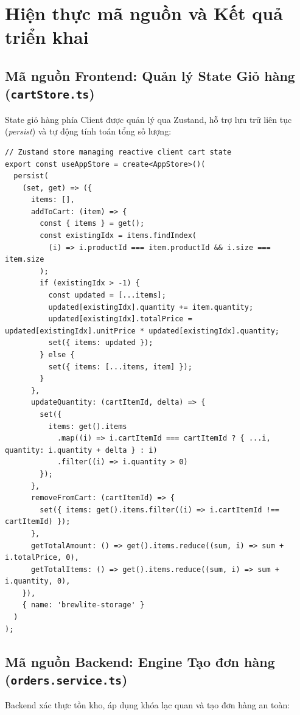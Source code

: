 \documentclass[a4paper]{article}
\begin{document}
\section{Hiện thực mã nguồn và Kết quả triển khai}

\subsection{Mã nguồn Frontend: Quản lý State Giỏ hàng (\texttt{cartStore.ts})}
State giỏ hàng phía Client được quản lý qua Zustand, hỗ trợ lưu trữ liên tục (\textit{persist}) và tự động tính toán tổng số lượng:

\begin{lstlisting}[caption={Zustand Cart State Store Implementation}]
// Zustand store managing reactive client cart state
export const useAppStore = create<AppStore>()(
  persist(
    (set, get) => ({
      items: [],
      addToCart: (item) => {
        const { items } = get();
        const existingIdx = items.findIndex(
          (i) => i.productId === item.productId && i.size === item.size
        );
        if (existingIdx > -1) {
          const updated = [...items];
          updated[existingIdx].quantity += item.quantity;
          updated[existingIdx].totalPrice = updated[existingIdx].unitPrice * updated[existingIdx].quantity;
          set({ items: updated });
        } else {
          set({ items: [...items, item] });
        }
      },
      updateQuantity: (cartItemId, delta) => {
        set({
          items: get().items
            .map((i) => i.cartItemId === cartItemId ? { ...i, quantity: i.quantity + delta } : i)
            .filter((i) => i.quantity > 0)
        });
      },
      removeFromCart: (cartItemId) => {
        set({ items: get().items.filter((i) => i.cartItemId !== cartItemId) });
      },
      getTotalAmount: () => get().items.reduce((sum, i) => sum + i.totalPrice, 0),
      getTotalItems: () => get().items.reduce((sum, i) => sum + i.quantity, 0),
    }),
    { name: 'brewlite-storage' }
  )
);
\end{lstlisting}

\subsection{Mã nguồn Backend: Engine Tạo đơn hàng (\texttt{orders.service.ts})}
Backend xác thực tồn kho, áp dụng khóa lạc quan và tạo đơn hàng an toàn:
\end{document}
